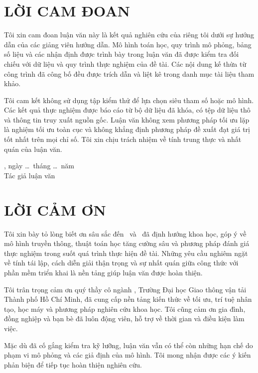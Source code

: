 \clearpage
\chapter*{LỜI CAM ĐOAN}
Tôi xin cam đoan luận văn này là kết quả nghiên cứu của riêng tôi dưới sự hướng dẫn của các giảng viên hướng dẫn. Mô hình toán học, quy trình mô phỏng, bảng số liệu và các nhận định được trình bày trong luận văn đã được kiểm tra đối chiếu với dữ liệu và quy trình thực nghiệm của đề tài. Các nội dung kế thừa từ công trình đã công bố đều được trích dẫn và liệt kê trong danh mục tài liệu tham khảo.

Tôi cam kết không sử dụng tập kiểm thử để lựa chọn siêu tham số hoặc mô hình. Các kết quả thực nghiệm được báo cáo từ bộ dữ liệu đã khóa, có tệp dữ liệu thô và thông tin truy xuất nguồn gốc. Luận văn không xem phương pháp tối ưu lặp là nghiệm tối ưu toàn cục và không khẳng định phương pháp đề xuất đạt giá trị tốt nhất trên mọi chỉ số. Tôi xin chịu trách nhiệm về tính trung thực và nhất quán của luận văn.

\vspace{1.2cm}
\begin{flushright}
\CompletionPlace, ngày \ldots\ tháng \ldots\ năm \CompletionYear\\
Tác giả luận văn\\[2.2cm]
\AuthorName
\end{flushright}

\clearpage
\chapter*{LỜI CẢM ƠN}
Tôi xin bày tỏ lòng biết ơn sâu sắc đến \SupervisorOne\ và \SupervisorTwo\ đã định hướng khoa học, góp ý về mô hình truyền thông, thuật toán học tăng cường sâu và phương pháp đánh giá thực nghiệm trong suốt quá trình thực hiện đề tài. Những yêu cầu nghiêm ngặt về tính tái lập, cách diễn giải thận trọng và sự nhất quán giữa công thức với phần mềm triển khai là nền tảng giúp luận văn được hoàn thiện.

Tôi trân trọng cảm ơn quý thầy cô ngành \MajorName, Trường Đại học Giao thông vận tải Thành phố Hồ Chí Minh, đã cung cấp nền tảng kiến thức về tối ưu, trí tuệ nhân tạo, học máy và phương pháp nghiên cứu khoa học. Tôi cũng cảm ơn gia đình, đồng nghiệp và bạn bè đã luôn động viên, hỗ trợ về thời gian và điều kiện làm việc.

Mặc dù đã cố gắng kiểm tra kỹ lưỡng, luận văn vẫn có thể còn những hạn chế do phạm vi mô phỏng và các giả định của mô hình. Tôi mong nhận được các ý kiến phản biện để tiếp tục hoàn thiện nghiên cứu.

